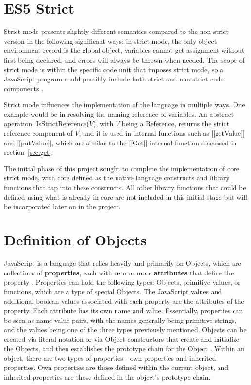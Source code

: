 \documentclass[a4paper,11pt,twoside]{report}
\begin{document}
\section{ES5 Strict}\label{sec:strict}
Strict mode presents slightly different semantics compared to the non-strict version in the following significant ways: in strict mode, the only object environment record is the global object, variables cannot get assignment without first being declared, and errors will always be thrown when needed. The scope of strict mode is within the specific code unit that imposes strict mode, so a JavaScript program could possibly include both strict and non-strict code components \cite{EcmaScript}.

Strict mode influences the implementation of the language in multiple ways. One example would be in resolving the naming reference of variables. An abstract operation, IsStrictReference($V$), with $V$ being a Reference, returns the strict reference component of $V$\cite{EcmaScript}, and it is used in internal functions such as [[getValue]] and [[putValue]], which are similar to the [[Get]] internal function discussed in section~\ref{sec:get}.

The initial phase of this project sought to complete the implementation of core strict mode, with core defined as the native language constructs and library functions that tap into these constructs. All other library functions that could be defined using what is already in core are not included in this initial stage but will be incorporated later on in the project.

\section{Definition of Objects}
JavaScript is a language that relies heavily and primarily on Objects, which are collections of \textbf{properties}, each with zero or more \textbf{attributes} that define the property \cite{EcmaScript}. Properties can hold the following types: Objects, primitive values, or functions, which are a type of special Objects. The JavaScript values and additional boolean values associated with each property are the attributes of the property. Each attribute has its own name and value. Essentially, properties can be seen as name-value pairs, with the names generally being primitive strings, and the values being one of the three types previously mentioned. Objects can be created via literal notation or via Object constructors that create and initialize the Objects, and then establishes the prototype chain for the Object \cite{EcmaScript}. Within an object, there are two types of properties - own properties and inherited properties. Own properties are those defined within the current object, and inherited properties are those defined in the object's prototype chain.
\end{document}
